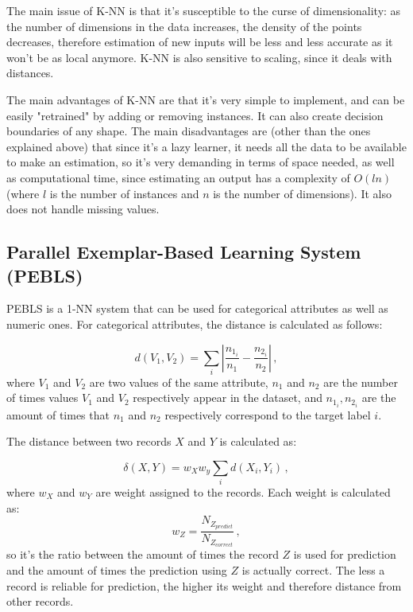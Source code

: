 The main issue of K-NN is that it's susceptible to the curse of dimensionality: as the number of dimensions in the data increases, the density of the points decreases, therefore estimation of new inputs will be less and less accurate as it won't be as local anymore. K-NN is also sensitive to scaling, since it deals with distances.

The main advantages of K-NN are that it's very simple to implement, and can be easily "retrained" by adding or removing instances. It can also create decision boundaries of any shape. The main disadvantages are (other than the ones explained above) that since it's a lazy learner, it needs all the data to be available to make an estimation, so it's very demanding in terms of space needed, as well as computational time, since estimating an output has a complexity of $O(ln)$ (where $l$ is the number of instances and $n$ is the number of dimensions). It also does not handle missing values.

\subsection{Parallel Exemplar-Based Learning System (PEBLS)}

PEBLS is a 1-NN system that can be used for categorical attributes as well as numeric ones. For categorical attributes, the distance is calculated as follows:

\begin{equation*}
    d(V_1,V_2) = \sum_i | \dfrac{n_{1_i}}{n_1} - \dfrac{n_{2_i}}{n_2} | \, ,
\end{equation*}
where $V_1$ and $V_2$ are two values of the same attribute, $n_1$ and $n_2$ are the number of times values $V_1$ and $V_2$ respectively appear in the dataset, and $n_{1_i}, n_{2_i}$ are the amount of times that $n_1$ and $n_2$ respectively correspond to the target label $i$.

The distance between two records $X$ and $Y$ is calculated as:

\begin{equation*}
    \delta (X, Y) = w_X w_y \sum_i d(X_i, Y_i) \, ,
\end{equation*}
where $w_X$ and $w_Y$ are weight assigned to the records. Each weight is calculated as:
\begin{equation*}
    w_Z = \dfrac{N_{Z_{\textit{predict}}}}{N_{Z_{\textit{correct}}}} \, ,
\end{equation*}
so it's the ratio between the amount of times the record $Z$ is used for prediction and the amount of times the prediction using $Z$ is actually correct. The less a record is reliable for prediction, the higher its weight and therefore distance from other records.

